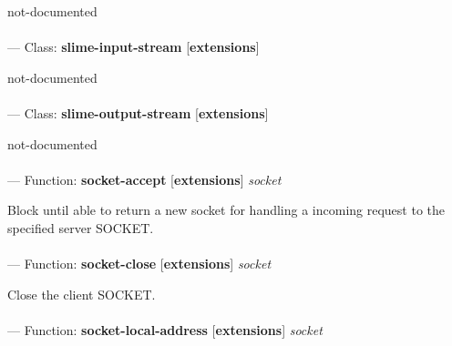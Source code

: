 \begin{adjustwidth}{5em}{5em}
not-documented
\end{adjustwidth}

\paragraph{}
\label{EXTENSIONS:SLIME-INPUT-STREAM}
--- Class: \textbf{slime-input-stream} [\textbf{extensions}] \textit{}

\begin{adjustwidth}{5em}{5em}
not-documented
\end{adjustwidth}

\paragraph{}
\label{EXTENSIONS:SLIME-OUTPUT-STREAM}
--- Class: \textbf{slime-output-stream} [\textbf{extensions}] \textit{}

\begin{adjustwidth}{5em}{5em}
not-documented
\end{adjustwidth}

\paragraph{}
\label{EXTENSIONS:SOCKET-ACCEPT}
--- Function: \textbf{socket-accept} [\textbf{extensions}] \textit{socket}

\begin{adjustwidth}{5em}{5em}
Block until able to return a new socket for handling a incoming request to the specified server SOCKET.
\end{adjustwidth}

\paragraph{}
\label{EXTENSIONS:SOCKET-CLOSE}
--- Function: \textbf{socket-close} [\textbf{extensions}] \textit{socket}

\begin{adjustwidth}{5em}{5em}
Close the client SOCKET.
\end{adjustwidth}

\paragraph{}
\label{EXTENSIONS:SOCKET-LOCAL-ADDRESS}
--- Function: \textbf{socket-local-address} [\textbf{extensions}] \textit{socket}

